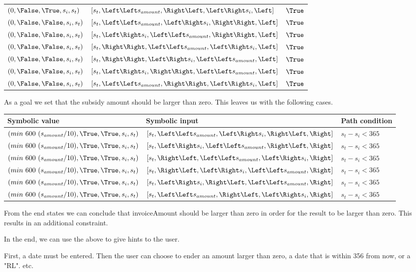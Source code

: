 \begin{tabular}{l|l|l}
  $(                        0, \False, \True, s_i, s_t)$ & $[s_t,\Left \Left s_{amount}, \Right \Left, \Left \Right s_i, \Left]$  & $\True$\\
  $(                        0, \False,\False, s_i, s_t)$ & $[s_t,\Left \Left s_{amount}, \Left \Right s_i, \Right\Right, \Left]$  & $\True$\\
  $(                        0, \False,\False, s_i, s_t)$ & $[s_t,\Left \Right s_i, \Left \Left s_{amount}, \Right\Right, \Left]$  & $\True$\\
  $(                        0, \False,\False, s_i, s_t)$ & $[s_t,\Right \Right,\Left \Left s_{amount}, \Left \Right s_i, \Left]$  & $\True$\\
  $(                        0, \False,\False, s_i, s_t)$ & $[s_t,\Right\Right, \Left \Right s_i, \Left \Left s_{amount}, \Left]$  & $\True$\\
  $(                        0, \False,\False, s_i, s_t)$ & $[s_t,\Left \Right s_i, \Right\Right, \Left \Left s_{amount}, \Left]$  & $\True$\\
  $(                        0, \False,\False, s_i, s_t)$ & $[s_t,\Left \Left s_{amount}, \Right\Right, \Left \Right s_i, \Left]$  & $\True$
\end{tabular}


As a goal we set that the subsidy amount should be larger than zero. This leaves us with the following cases.

\begin{tabular}{l|l|l}
  Symbolic value & Symbolic input & Path condition\\
  \hline
  $(min\ 600\ (s_{amount}/10),  \True, \True, s_i, s_t)$ & $[s_t,\Left \Left s_{amount}, \Left \Right s_i, \Right \Left, \Right]$ & $s_t-s_i<365$\\
  $(min\ 600\ (s_{amount}/10),  \True, \True, s_i, s_t)$ & $[s_t,\Left \Right s_i, \Left \Left s_{amount}, \Right \Left, \Right]$ & $s_t-s_i<365$\\
  $(min\ 600\ (s_{amount}/10),  \True, \True, s_i, s_t)$ & $[s_t,\Right \Left, \Left \Left s_{amount}, \Left \Right s_i, \Right]$ & $s_t-s_i<365$\\
  $(min\ 600\ (s_{amount}/10),  \True, \True, s_i, s_t)$ & $[s_t,\Right \Left, \Left \Right s_i, \Left \Left s_{amount}, \Right]$ & $s_t-s_i<365$\\
  $(min\ 600\ (s_{amount}/10),  \True, \True, s_i, s_t)$ & $[s_t,\Left \Right s_i, \Right \Left, \Left \Left s_{amount}, \Right]$ & $s_t-s_i<365$\\
  $(min\ 600\ (s_{amount}/10),  \True, \True, s_i, s_t)$ & $[s_t,\Left \Left s_{amount}, \Right \Left, \Left \Right s_i, \Right]$ & $s_t-s_i<365$
\end{tabular}

From the end states we can conclude that invoiceAmount should be larger than zero in order for the result to be larger than zero. This results in an additional constraint.

In the end, we can use the above to give hints to the user.

First, a date must be entered. Then the user can choose to ender an amount larger than zero, a date that is within 356 from now, or a "RL".
etc.
